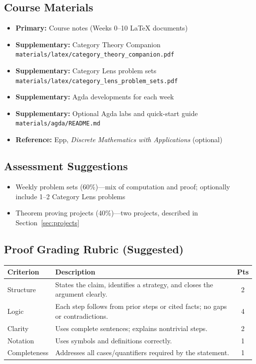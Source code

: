 \documentclass[11pt]{article}
\begin{document}
\subsection{Course Materials}
\begin{itemize}
    \item \textbf{Primary:} Course notes (Weeks 0--10 LaTeX documents)
    \item \textbf{Supplementary:} Category Theory Companion\\
    \texttt{materials/latex/category\_theory\_companion.pdf}
    \item \textbf{Supplementary:} Category Lens problem sets\\
    \texttt{materials/latex/category\_lens\_problem\_sets.pdf}
    \item \textbf{Supplementary:} Agda developments for each week
    \item \textbf{Supplementary:} Optional Agda labs and quick-start guide\\
    \texttt{materials/agda/README.md}
    \item \textbf{Reference:} Epp, \textit{Discrete Mathematics with Applications} (optional)
\end{itemize}

\subsection{Assessment Suggestions}
\begin{itemize}
    \item Weekly problem sets (60\%)---mix of computation and proof; optionally include 1--2 Category Lens problems
    \item Theorem proving projects (40\%)---two projects, described in Section~\ref{sec:projects}
\end{itemize}

\subsection{Proof Grading Rubric (Suggested)}
\begin{center}
\begin{tabularx}{\linewidth}{l X c}
\toprule
\textbf{Criterion} & \textbf{Description} & \textbf{Pts} \\
\midrule
Structure & States the claim, identifies a strategy, and closes the argument clearly. & 2 \\
Logic & Each step follows from prior steps or cited facts; no gaps or contradictions. & 4 \\
Clarity & Uses complete sentences; explains nontrivial steps. & 2 \\
Notation & Uses symbols and definitions correctly. & 1 \\
Completeness & Addresses all cases/quantifiers required by the statement. & 1 \\
\bottomrule
\end{tabularx}
\end{center}
\end{document}
